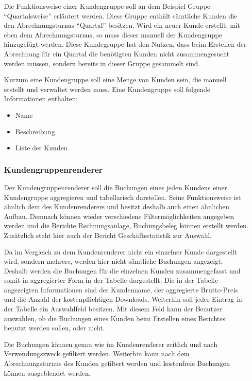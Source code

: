Die Funktionsweise einer Kundengruppe soll an dem Beispiel Gruppe "`Quartalsweise"' erläutert werden.
Diese Gruppe enthält sämtliche Kunden die den Abrechnungsturnus "`Quartal"' besitzen. Wird ein neuer Kunde erstellt, mit eben dem Abrechnungsturnus, so muss dieser manuell der Kundengruppe hinzugefügt werden.
Diese Kundegruppe hat den Nutzen, dass beim Erstellen der Abrechnung für ein Quartal die benötigten Kunden nicht zusammengesucht werden müssen, sondern bereits in dieser Gruppe gesammelt sind.

Kurzum eine Kundengruppe soll eine Menge von Kunden sein, die manuell erstellt und verwaltet werden muss. Eine Kundengruppe soll folgende Informationen enthalten:
\begin{itemize}
\item Name
\item Beschreibung
\item Liste der Kunden
\end{itemize}
 
\subsubsection{Kundengruppenrenderer}
Der Kundengruppenrenderer soll die Buchungen eines jeden Kundens einer Kundengruppe aggregieren und tabellarisch darstellen.
Seine Funktionsweise ist ähnlich dem des Kundenrenderers und besitzt deshalb auch einen ähnlichen Aufbau.
Demnach können wieder verschiedene Filtermöglichkeiten angegeben werden und die Berichte Rechnungsanlage, Buchungsbeleg können erstellt werden. Zusätzlich steht hier auch der Bericht Geschäftsstatistik zur Auswahl.

Da im Vergleich zu dem Kundenrenderer nicht ein einzelner Kunde dargestellt wird, sondern mehrere, werden hier nicht sämtliche Buchungen angezeigt. Deshalb werden die Buchungen für die einzelnen Kunden zusammengefasst und somit in aggregierter Form in der Tabelle dargestellt.
Die in der Tabelle angezeigten Informationen sind der Kundenname, der aggregierte Brutto-Preis und die Anzahl der kostenpflichtigen Downloads. Weiterhin soll jeder Eintrag in der Tabelle ein Auswahlfeld besitzen. Mit diesem Feld kann der Benutzer auswählen, ob die Buchungen eines Kunden beim Erstellen eines Berichtes benutzt werden sollen, oder nicht.

Die Buchungen können genau wie im Kundenrenderer zeitlich und nach Verwendungszweck gefiltert werden. Weiterhin kann nach dem Abrechnungsturnus des Kunden gefiltert werden und kostenfreie Buchungen können ausgeblendet werden.

